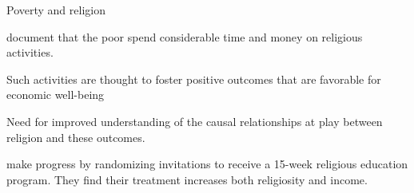 \documentclass[aspectratio=169, 10pt, handout]{beamer}
\newenvironment{wideitemize}{\itemize\addtolength{\itemsep}{10pt}}{\enditemize}
\begin{document}
\begin{frame}{Poverty and religion}

\begin{wideitemize}

	\item \cite{Banerjee2007} document that the poor spend considerable time and money on religious activities. 

	\item Such activities are thought to foster positive outcomes that are favorable for economic well-being \citep{freeman1986escapes,gruber2005religious,ellison1991religious,gruber2008church}
	
	\item Need for improved understanding of the causal relationships at play between religion and these outcomes. 
	
	\item \cite{bryan2018randomizing} make progress by randomizing invitations to receive a 15-week religious education program. They find their treatment increases both religiosity and income.

\end{wideitemize}


\end{frame}
\end{document}
